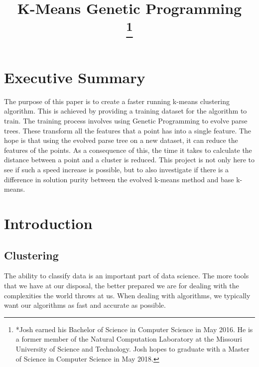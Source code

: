 \documentclass[conference]{IEEEtran}
\begin{document}
\title{K-Means Genetic Programming\\
\thanks{*Josh earned his Bachelor of Science in Computer Science in May 2016.  He is a former member of the Natural Computation Laboratory at the Missouri University of Science and Technology.  Josh hopes to graduate with a Master of Science in Computer Science in May 2018.}
}

\author{
}

\maketitle

\onecolumn
\tableofcontents
\clearpage


\section{Executive Summary}
The purpose of this paper is to create a faster running k-means clustering algorithm.  This is achieved by providing a training dataset for the algorithm to train.  The training process involves using Genetic Programming to evolve parse trees.  These transform all the features that a point has into a single feature.  The hope is that using the evolved parse tree on a new dataset, it can reduce the features of the points.  As a consequence of this, the time it takes to calculate the distance between a point and a cluster is reduced.  This project is not only here to see if such a speed increase is possible, but to also investigate if there is a difference in solution purity between the evolved k-means method and base k-means.

\clearpage

\section{Introduction}
\subsection{Clustering}
The ability to classify data is an important part of data science.  The more tools that we have at our disposal, the better prepared we are for dealing with the complexities the world throws at us.  When dealing with algorithms, we typically want our algorithms as fast and accurate as possible.
\end{document}
